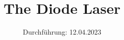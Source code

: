 

\subject{VERSUCH NUMMER 60}
\title{The Diode Laser}
\date{%
  Durchführung: 12.04.2023
  \hspace{3em}
}



\maketitle
\thispagestyle{empty}
\tableofcontents
\newpage






\printbibliography{}



